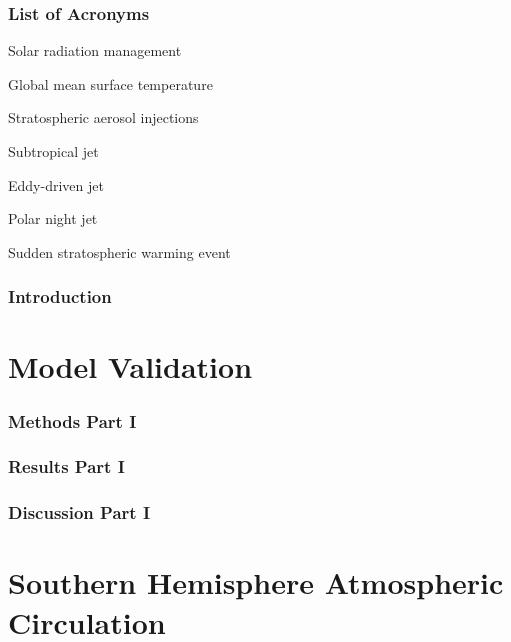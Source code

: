 \documentclass[12pt]{article}
\begin{document}


\tableofcontents
\section*{List of Acronyms}
\begin{description}[align=right, labelwidth=2cm, labelsep=1cm]
  \item[\textbf{SRM}] Solar radiation management
  \item[\textbf{GMST}] Global mean surface temperature
  \item[\textbf{SAI}] Stratospheric aerosol injections
  \item[\textbf{STJ}] Subtropical jet
  \item[\textbf{EDJ}] Eddy-driven jet
  \item[\textbf{PNJ}] Polar night jet
  \item[\textbf{SSW}] Sudden stratospheric warming event    
\end{description}
\newpage

\section{Introduction}

\newpage

\part{Model Validation}

\section{Methods Part I}

\newpage

\section{Results Part I}

\newpage

\section{Discussion Part I}

\newpage

\part{Southern Hemisphere Atmospheric Circulation}
\end{document}
